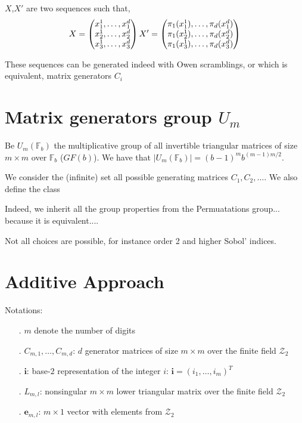 \documentclass[]{elsarticle}
\theoremstyle{definition}
\newcommand{\bvec}[1]{\boldsymbol{#1}}
\newcommand{\vi}{\bvec{i}}
\newcommand{\ve}{\bvec{e}}
\def\abs#1{\ensuremath{\left \lvert #1 \right \rvert}}
\begin{document}
$X$,$X'$ are two sequences such that,
\[
X = \begin{pmatrix}
x_1^1,\dots,x_1^d \\
x_2^1,\dots,x_2^d \\
x_3^1,\dots,x_3^d \\
\end{pmatrix} \\
X' = \begin{pmatrix}
\pi_1(x_1^1),\dots,\pi_d(x_1^d) \\
\pi_1(x_2^1),\dots,\pi_d(x_2^d) \\
\pi_1(x_3^1),\dots,\pi_d(x_3^d) \\
\end{pmatrix}
\]

These sequences can be generated indeed with Owen scramblings, or which is equivalent, matrix generators $C_i$

\section{Matrix generators group $U_m$}

Be $U_m(\mathbb{F}_b)$ the multiplicative group of all invertible triangular matrices of size $m\times m$ over $\mathbb{F}_b$ ($GF(b)$). We have that $\abs{U_m(\mathbb{F}_b)}=(b-1)^m b^{(m-1)m/2}$.

We consider the (infinite) set all possible generating matrices $C_1,C_2,\dots$. We also define the class 

Indeed, we inherit all the group properties from the Permuatations group... because it is equivalent....

Not all choices are possible, for instance order 2 and higher Sobol' indices.


\section{Additive Approach}
Notations:
\begin{itemize}
\item[.] $m$ denote the number of digits
\item[.] $C_{m,1},\dots,C_{m,d}$: $d$ generator matrices of size $m \times m$ over the finite field $\mathcal{Z}_2$
\item[.] $\vi$: base-$2$ representation of the integer $i$: $\vi=(i_1,\dots,i_m)^T$
\item[.] $L_{m,l}$: nonsingular $m \times m$ lower triangular matrix over the finite field $\mathcal{Z}_2$
\item[.] $\ve_{m,l}$: $m \times 1$ vector with elements from $\mathcal{Z}_2$
\end{itemize}
\end{document}
